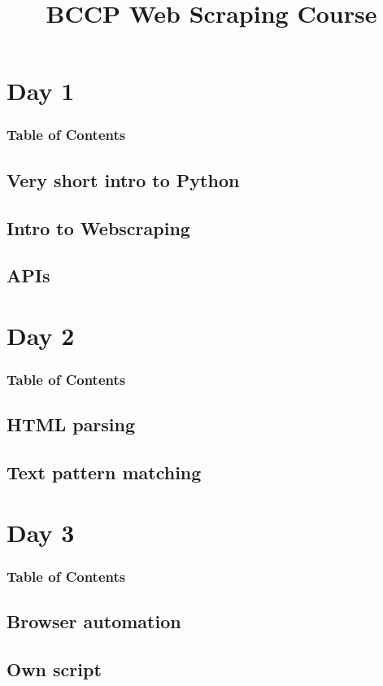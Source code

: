 \documentclass[english,aspectratio=169]{beamer}
\begin{document}
\title[Web scraping]{BCCP Web Scraping Course}
\titlegraphic{}


\date[]{}

\begin{frame}
    \titlepage
\end{frame}

\section{Day 1}
\label{sec:day1}


\begin{frame}
    \frametitle{Table of Contents}
    \tableofcontents[currentsection]
\end{frame}

\subsection{Very short intro to Python}
\label{sec:intropython}


\subsection{Intro to Webscraping}
\label{sec:introwebscraping}



\subsection{APIs}
\label{sec:apis}


\section{Day 2}

\begin{frame}
    \frametitle{Table of Contents}
    \tableofcontents[currentsection]
\end{frame}

\subsection{HTML parsing}



\subsection{Text pattern matching}

\section{Day 3}

\begin{frame}
    \frametitle{Table of Contents}
    \tableofcontents[currentsection]
\end{frame}

\subsection{Browser automation}



\subsection{Own script}
\end{document}
